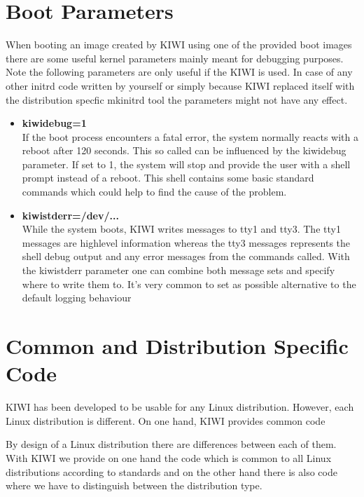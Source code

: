 \section{Boot Parameters}
When booting an image created by KIWI using one of the provided
boot images there are some useful kernel parameters mainly meant
for debugging purposes. Note the following parameters are
only useful if the KIWI  is used. In case of any other
initrd code written by yourself or simply because KIWI replaced
itself with the distribution specfic mkinitrd tool the parameters
might not have any effect.

\begin{itemize}
\item \textbf{kiwidebug=1}\\
      If the boot process encounters a fatal error, the system normally
      reacts with a reboot after 120 seconds. This so called 
      can be influenced by the kiwidebug parameter. If set to 1, the system
      will stop and provide the user with a shell prompt instead of a
      reboot. This shell contains some basic standard commands which 
      could help to find the cause of the problem.
\item \textbf{kiwistderr=/dev/...}\\
      While the system boots, KIWI writes messages to tty1 and tty3. The
      tty1 messages are highlevel information whereas the tty3 messages
      represents the shell debug output and any error messages from
      the commands called. With the kiwistderr parameter one can combine
      both message sets and specify where to write them to. It's very
      common to set  as possible alternative to the default
      logging behaviour
\end{itemize}

\section{Common and Distribution Specific Code}
KIWI has been developed to be usable for any Linux distribution.
However, each Linux distribution is different. On one hand, KIWI
provides common code 

By design of a Linux distribution there are differences between
each of them. With KIWI we provide on one hand the code which
is common to all Linux distributions according to standards and
on the other hand there is also code where we have to distinguish
between the distribution type.

